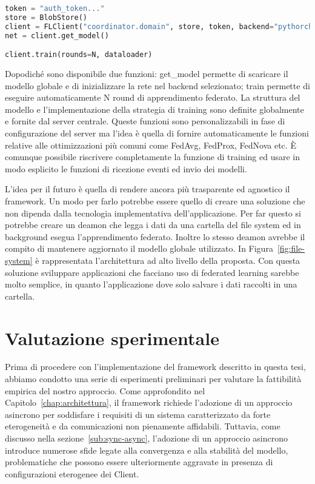 \documentclass[a4paper, oneside, openright]{report}
\begin{document}
\lstset{style=longBlock}
\begin{lstlisting}[language=Python]
token = "auth_token..."
store = BlobStore()
client = FLClient("coordinator.domain", store, token, backend="pythorch")
net = client.get_model()

client.train(rounds=N, dataloader)
\end{lstlisting}\label{code:client}
\lstset{style=codeStyle}

Dopodiché sono disponibile due funzioni: get\_model permette di scaricare il modello globale e di inizializzare la rete nel backend selezionato; train permette di eseguire automaticamente N round di apprendimento federato. La struttura del modello e l'implementazione della strategia di training sono definite globalmente e fornite dal server centrale. Queste funzioni sono personalizzabili in fase di configurazione del server ma l'idea è quella di fornire automaticamente le funzioni relative alle ottimizzazioni più comuni come FedAvg, FedProx, FedNova etc. È comunque possibile riscrivere completamente la funzione di training ed usare in modo esplicito le funzioni di ricezione eventi ed invio dei modelli.



L'idea per il futuro è quella di rendere ancora più trasparente ed agnostico il framework. Un modo per farlo potrebbe essere quello di creare una soluzione che non dipenda dalla tecnologia implementativa dell'applicazione. Per far questo si potrebbe creare un deamon che legga i dati da una cartella del file system ed in background esegua l'apprendimento federato. Inoltre lo stesso deamon avrebbe il compito di mantenere aggiornato il modello globale utilizzato. In Figura~\ref{fig:file-system} è rappresentata l'architettura ad alto livello della proposta. Con questa soluzione sviluppare applicazioni che facciano uso di federated learning sarebbe molto semplice, in quanto l'applicazione dove solo salvare i dati raccolti in una cartella. 


 \clearpage{}
\clearpage{}\chapter{Valutazione sperimentale}\label{chap:valutazione}

Prima di procedere con l'implementazione del framework descritto in questa tesi, abbiamo condotto una serie di esperimenti preliminari per valutare la fattibilità empirica del nostro approccio. Come approfondito nel Capitolo~\ref{chap:architettura}, il framework richiede l'adozione di un approccio asincrono per soddisfare i requisiti di un sistema caratterizzato da forte eterogeneità e da comunicazioni non pienamente affidabili. Tuttavia, come discusso nella sezione~\ref{sub:sync-async}, l'adozione di un approccio asincrono introduce numerose sfide legate alla convergenza e alla stabilità del modello, problematiche che possono essere ulteriormente aggravate in presenza di configurazioni eterogenee dei Client.
\end{document}
